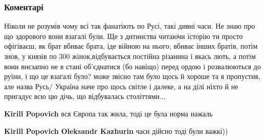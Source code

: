  
 
 
 
 
\subsubsection{Коментарі}

\begin{itemize}
 

Ніколи не розумів чому всі так фанатіють по Русі, такі дивні часи. Не знаю про
що здорового вони взагалі були. Ще з дитинства читаючи історію ти просто
офігіваєш, як брат вбиває брата, іде війною на нього, вбиває інших братів,
потім знов, у князів по 300 жінок,відбувається постійна різанина і якась лють,
а потім вони внєзапно не в стані об'єднатися (бо навіщо) перед ордою і
розвалюються до руїни, і що це взагалі було? може звісно там було щось й хороше
та я пропустив, але назва Русь/ Україна наче про щось світле і далеке, а на
ділі ніхто й не пригадує всю цю дічь, що відбувалась століттями...


\begin{itemize}
 
\textbf{Kirill Popovich} вся Європа так жила, тоді це була норма нажаль

 
\textbf{Kirill Popovich} \textbf{Oleksandr Kazhurin} часи дійсно тоді були важкі))
\end{itemize}


\end{itemize}
